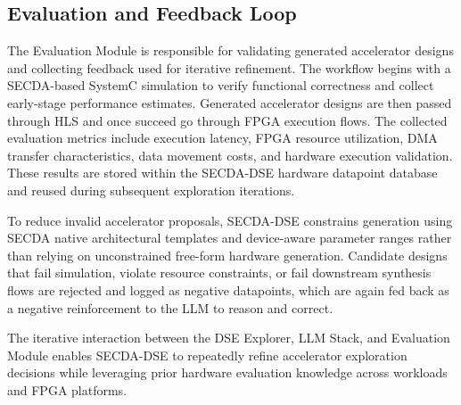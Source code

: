 
\subsection{Evaluation and Feedback Loop}

The Evaluation Module is responsible for validating generated accelerator designs and collecting feedback used for iterative refinement. The workflow begins with a SECDA-based SystemC simulation to verify functional correctness and collect early-stage performance estimates. Generated accelerator designs are then passed through HLS and once succeed go through FPGA execution flows. 
The collected evaluation metrics include execution latency, FPGA resource utilization, DMA transfer characteristics, data movement costs, and hardware execution validation. These results are stored within the SECDA-DSE hardware datapoint database and reused during subsequent exploration iterations.

To reduce invalid accelerator proposals, SECDA-DSE constrains generation using SECDA native architectural templates and device-aware parameter ranges rather than relying on unconstrained free-form hardware generation. Candidate designs that fail simulation, violate resource constraints, or fail downstream synthesis flows are rejected and logged as negative datapoints, which are again fed back as a negative reinforcement to the LLM to reason and correct.

The iterative interaction between the DSE Explorer, LLM Stack, and Evaluation Module enables SECDA-DSE to repeatedly refine accelerator exploration decisions while leveraging prior hardware evaluation knowledge across workloads and FPGA platforms. 

